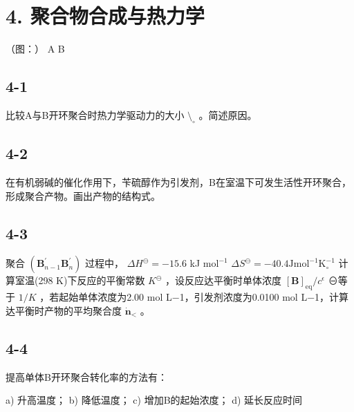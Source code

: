 \section*{4. 聚合物合成与热力学}
（图：）
A
B

\subsection*{4-1}
⽐较A与B开环聚合时热⼒学驱动⼒的⼤⼩ $\setminus _ { \circ }$ 。简述原因。

\subsection*{4-2}
在有机弱碱的催化作⽤下，苄硫醇作为引发剂，B在室温下可发⽣活性开环聚合，形成聚合产物。画出产物的结构式。

\subsection*{4-3}
聚合 $( \mathbf { B } _ { n - 1 } ^ { \prime }   \mathbf { B } _ { n } ^ { \prime } )$ 过程中， $\Delta H ^ { \ominus } = - 1 5 . 6$ kJ $\mathrm { m o l ^ { - 1 } }$ $\Delta S ^ { \ominus } = - 4 0 . 4 \mathrm { J } \mathrm { m o l } ^ { - 1 } \mathrm { K } _ { \circ } ^ { - 1 }$ 计算室温(298 K)下反应的平衡常数 $K ^ { \ominus }$ ，设反应达平衡时单体浓度 $[ \mathbf { B } ] _ { \mathrm { e q } } / c ^ { \epsilon }$ ⊖等于 $1 / K$ ，若起始单体浓度为2.00 mol L−1，引发剂浓度为0.0100 mol L−1，计算达平衡时产物的平均聚合度 $\dot { \boldsymbol { n } } _ { < }$ 。

\subsection*{4-4}
提⾼单体B开环聚合转化率的⽅法有：

a) 升⾼温度； b) 降低温度； c) 增加B的起始浓度； d) 延⻓反应时间
